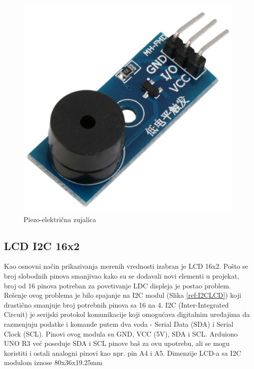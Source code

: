 \documentclass[a4paper, 12pt]{article}
\begin{document}
\begin{figure}[H]
\centering
\includegraphics[scale=0.2]{images/buzzer}
\caption{Piezo-električna zujalica} \label{ref:buzzer}
\end{figure}

\vspace{10pt}

\pagebreak

	\subsection{LCD I2C 16x2}
	
	Kao osnovni način prikazivanja merenih vrednosti izabran je LCD 16x2. Pošto se broj slobodnih pinova smanjivao kako su se dodavali novi elementi u projekat, broj od 16 pinova potreban za povetivanje LDC displeja je postao problem. Rešenje ovog problema je bilo spajanje na I2C modul (Slika \ref{ref:I2CLCD}) koji drastično smanjuje broj potrebnih pinova sa 16 na 4. I2C (Inter-Integrated Circuit) je serijski protokol komunikacije koji omogućava digitalnim uređajima da razmenjuju podatke i komande putem dva voda - Serial Data (SDA) i Serial Clock (SCL). Pinovi ovog modula su GND, VCC (5V), SDA i SCL. Arduiono UNO R3 već poseduje SDA i SCL pinove baš za ovu upotrebu, ali se mogu koristiti i ostali analogni pinovi kao npr. pin A4 i A5. Dimenzije LCD-a sa I2C modulom iznose 80x36x19.25mm
	
\end{document}
